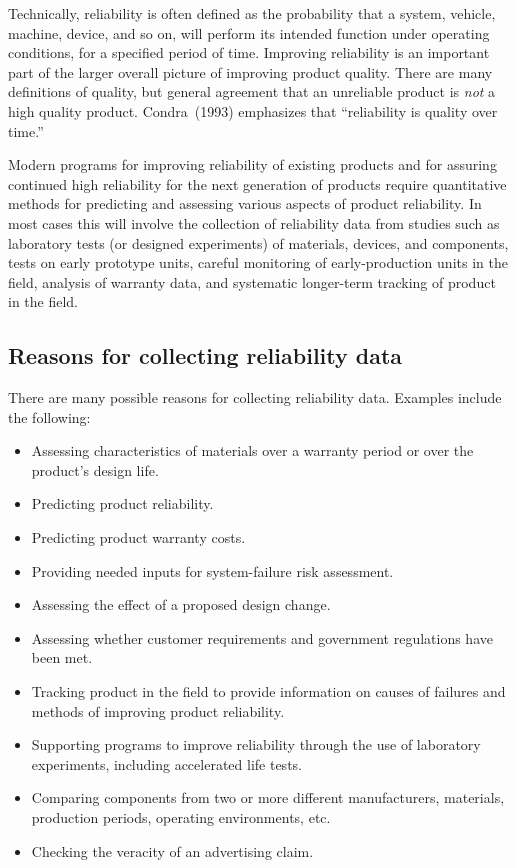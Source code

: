 Technically, reliability is often defined as the probability that a
system, vehicle, machine, device, and so on, will perform its intended
function under operating conditions, for a specified
period of time. Improving reliability is an important part of the
larger overall picture of improving product quality. There are many
definitions of quality, but general agreement that an unreliable
product is {\em not} a high quality product.  Condra~(1993) emphasizes
that ``reliability is quality over time.''

Modern programs for improving reliability of existing products and for
assuring continued high reliability for the next generation of
products require quantitative methods for predicting and assessing
various aspects of product reliability.  In most cases this will
involve the collection of reliability data from studies such as
laboratory tests (or designed experiments) of materials, devices, and
components, tests on early prototype units, careful monitoring of
early-production units in the field, analysis of warranty data, and
systematic longer-term tracking of product in the field.
 
\subsection{Reasons for collecting reliability data}

There are many possible reasons for collecting reliability data.
Examples include the following:

\begin{itemize} 
\item
Assessing characteristics of materials over a warranty period or over
the product's design life.
\item 
Predicting product reliability.
\item 
Predicting product warranty costs.
\item
Providing needed inputs for system-failure risk assessment.
\item
Assessing the effect of a proposed design change.
\item
Assessing whether customer requirements and government regulations
have
been met.
\item
Tracking product in the field to provide information on
causes of failures and methods of improving product reliability.
\item 
Supporting programs to improve reliability through the use of
laboratory experiments, including accelerated life tests.
\item 
Comparing components from two or more different manufacturers, materials,
production periods, operating environments, etc.
\item
Checking the veracity of an advertising claim.
\end{itemize}



